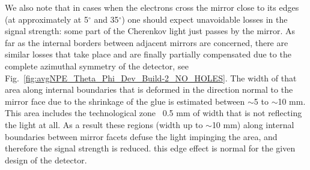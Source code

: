 We also note that in cases when the electrons cross the mirror close to its edges (at approximately at 5$^\circ$ and 35$^\circ$) one should expect unavoidable losses in the signal strength: some part of the Cherenkov light just passes by the mirror. As far as the internal borders between adjacent mirrors are concerned, there are similar losses that take place and are finally partially compensated due to the complete azimuthal symmetry of the detector, see Fig.~\ref{fig:avgNPE_Theta_Phi_Dev_Build-2_NO_HOLES}. The width of that area along internal boundaries that is deformed in the direction normal to the mirror face due to the shrinkage of the glue is estimated between $\sim$5 to $\sim$10 mm. This area includes the technological zone ~0.5 mm of width that is not reflecting the light at all. As a result these regions (width up to $\sim$10 mm) along internal boundaries between mirror facets defuse the light impinging the area, and therefore the signal strength is reduced. this edge effect is normal for the given design of the detector.

